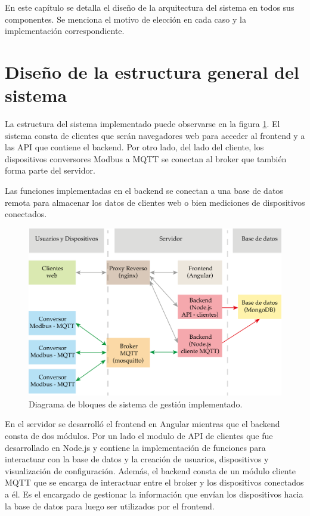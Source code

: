 En este capítulo se detalla el diseño de la arquitectura del sistema en todos sus componentes. Se menciona el motivo de elección en cada caso y la implementación correspondiente.

\section{Diseño de la estructura general del sistema}
\label{seccion-intro}
La estructura del sistema implementado puede observarse en la figura \ref{fig:esquema-general}. El sistema consta de clientes que serán navegadores web para acceder al frontend y a las API \citep{WEBSITE:34} que contiene el backend. Por otro lado, del lado del cliente, los dispositivos conversores Modbus a MQTT se conectan al broker que también forma parte del servidor.

Las funciones implementadas en el backend se conectan a una base de datos remota para almacenar los datos de clientes web o bien mediciones de dispositivos conectados.

\begin{figure}[htpb]
	\centering
	\includegraphics[scale=.75]{./Figures/esquema-general.png}
	\caption[Diagrama de bloques de sistema implementado ]{Diagrama de bloques de sistema de gestión implementado.}
	\label{fig:esquema-general}
\end{figure}
 
En el servidor se desarrolló el frontend en Angular mientras que el backend consta de dos módulos. Por un lado el modulo de API de clientes que fue desarrollado en Node.js y contiene la implementación de funciones para interactuar con la base de datos y la creación de usuarios, dispositivos y visualización de configuración.  Además, el backend consta de un módulo cliente MQTT que se encarga de interactuar entre el broker y los dispositivos conectados a él. Es el encargado de gestionar la información que envían los dispositivos hacia la base de datos para luego ser utilizados por el frontend. 

